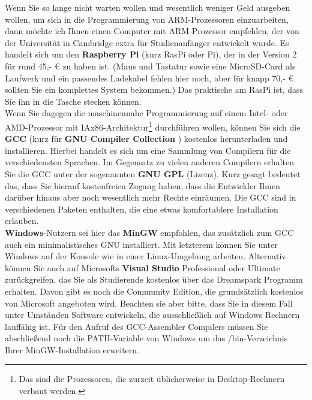 Wenn Sie so lange nicht warten wollen und wesentlich weniger Geld ausgeben wollen, um sich in die Programmierung von ARM-Prozessoren einzuarbeiten, dann möchte ich Ihnen einen Computer mit ARM-Prozessor empfehlen, der von der Universität in Cambridge extra für Studienanfänger entwickelt wurde. Es handelt sich um den \textbf{Raspberry Pi} (kurz RasPi oder Pi), der in der Version 2 für rund 45,- € zu haben ist. (Maus und Tastatur sowie eine MicroSD-Card als Laufwerk und ein passendes Ladekabel fehlen hier noch, aber für knapp 70,- € sollten Sie ein komplettes System bekommen.) Das praktische am RasPi ist, dass Sie ihn in die Tasche stecken können.\\

Wenn Sie dagegen die maschinennahe Programmierung auf einem Intel- oder AMD-Prozessor mit IAx86-Architektur\footnote{Das sind die Prozessoren, die zurzeit üblicherweise in Desktop-Rechnern verbaut werden.} durchführen wollen, können Sie sich die \textbf{GCC} (kurz für \textbf{GNU Compiler Collection} ) kostenlos herunterladen und installieren. Hierbei handelt es sich um eine Sammlung von Compilern für die verschiedensten Sprachen. Im Gegensatz zu vielen anderen Compilern erhalten Sie die GCC unter der sogenannten \textbf{GNU GPL} (Lizenz). Kurz gesagt bedeutet das, dass Sie hierauf kostenfreien Zugang haben, dass die Entwickler Ihnen darüber hinaus aber noch wesentlich mehr Rechte einräumen. Die GCC sind in verschiedenen Paketen enthalten, die eine etwas komfortablere Installation erlauben.\\

\textbf{Windows}-Nutzern sei hier das \textbf{MinGW} empfohlen, das zusätzlich zum GCC auch ein minimalistisches GNU installiert. Mit letzterem können Sie unter Windows auf der Konsole wie in einer Linux-Umgebung arbeiten. Alternativ können Sie auch auf Microsofts \textbf{Visual Studio} Professional oder Ultimate zurückgreifen, das Sie als Studierende kostenlos über das Dreamspark Programm erhalten. Davon gibt es noch die Community Edition, die grundsätzlich kostenlos von Microsoft angeboten wird. Beachten sie aber bitte, dass Sie in diesem Fall unter Umständen Software entwickeln, die ausschließlich auf Windows Rechnern lauffähig ist. Für den Aufruf des GCC-Assembler Compilers müssen Sie abschließend noch die PATH-Variable von Windows um das /bin-Verzeichnis Ihrer MinGW-Installation erweitern.\\


